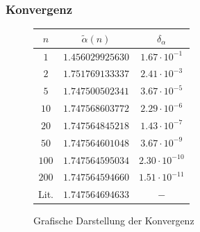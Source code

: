 \documentclass[10pt,a4paper]{article}
\begin{document}
\subsubsection{Konvergenz}

\label{sssec:Konvergenz}
\vspace{\baselineskip}
\begin{figure}[h]
\begin{minipage}[c]{0.5\textwidth}
\captionsetup{type=figure}
\begin{center}
\resizebox{\columnwidth}{!}{}
\caption{Grafische Darstellung der Konvergenz}
\label{plotkonvergenz3d}
\end{center}
\end{minipage}
\begin{minipage}[c]{0.5\textwidth}
\captionsetup{type=table}
\begin{center}
\begin{tabular}{c|c|c}
\rule[-1ex]{0pt}{2.5ex} $n$ & $\tilde{\alpha}(n)$ & $\delta_\alpha$ \\ 
\hline 
\rule[-1ex]{0pt}{2.5ex} $1$ & $1.456029925630$ & $1.67\cdot10^{-1}$ \\ 
\hline 
\rule[-1ex]{0pt}{2.5ex} $2$ & $1.751769133337$ & $2.41\cdot10^{-3}$ \\ 
\hline
\rule[-1ex]{0pt}{2.5ex} $5$ & $1.747500502341$ & $3.67\cdot10^{-5}$ \\ 
\hline 
\rule[-1ex]{0pt}{2.5ex} $10$ & $1.747568603772$ & $2.29\cdot10^{-6}$ \\ 
\hline 
\rule[-1ex]{0pt}{2.5ex} $20$ & $1.747564845218$ & $1.43\cdot10^{-7}$ \\ 
\hline 
\rule[-1ex]{0pt}{2.5ex} $50$ & $1.747564601048$ & $3.67\cdot10^{-9}$ \\
\hline
\rule[-1ex]{0pt}{2.5ex} $100$ & $1.747564595034$ & $2.30\cdot10^{-10}$ \\ 
\hline
\rule[-1ex]{0pt}{2.5ex} $200$ & $1.747564594660$ & $1.51\cdot10^{-11}$ \\ 
\hline
\rule[1ex]{0pt}{2.5ex} Lit. & $1.747564694633$ & $ - $
\end{tabular}
\label{tab:konvergenz3d}
\end{center}
\end{minipage}
\end{figure}
\end{document}
